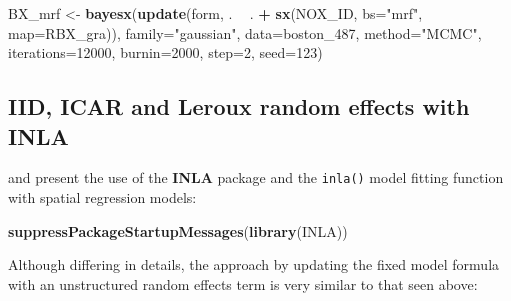 \documentclass[]{book}
\newenvironment{Shaded}{\begin{snugshade}}{\end{snugshade}}
\newcommand{\DataTypeTok}[1]{\textcolor[rgb]{0.13,0.29,0.53}{#1}}
\newcommand{\DecValTok}[1]{\textcolor[rgb]{0.00,0.00,0.81}{#1}}
\newcommand{\KeywordTok}[1]{\textcolor[rgb]{0.13,0.29,0.53}{\textbf{#1}}}
\newcommand{\NormalTok}[1]{#1}
\newcommand{\OperatorTok}[1]{\textcolor[rgb]{0.81,0.36,0.00}{\textbf{#1}}}
\newcommand{\StringTok}[1]{\textcolor[rgb]{0.31,0.60,0.02}{#1}}
\begin{document}
\begin{Shaded}
\begin{Highlighting}[]
\NormalTok{BX_mrf <-}\StringTok{ }\KeywordTok{bayesx}\NormalTok{(}\KeywordTok{update}\NormalTok{(form, . }\OperatorTok{~}\StringTok{ }\NormalTok{. }\OperatorTok{+}\StringTok{ }\KeywordTok{sx}\NormalTok{(NOX_ID, }\DataTypeTok{bs=}\StringTok{"mrf"}\NormalTok{, }\DataTypeTok{map=}\NormalTok{RBX_gra)), }
                 \DataTypeTok{family=}\StringTok{"gaussian"}\NormalTok{, }\DataTypeTok{data=}\NormalTok{boston_}\DecValTok{487}\NormalTok{, }\DataTypeTok{method=}\StringTok{"MCMC"}\NormalTok{, }
                 \DataTypeTok{iterations=}\DecValTok{12000}\NormalTok{, }\DataTypeTok{burnin=}\DecValTok{2000}\NormalTok{, }\DataTypeTok{step=}\DecValTok{2}\NormalTok{, }\DataTypeTok{seed=}\DecValTok{123}\NormalTok{)}
\end{Highlighting}
\end{Shaded}

\begin{Shaded}
\end{Shaded}

\hypertarget{iid-icar-and-leroux-random-effects-with-inla}{%
\subsection{IID, ICAR and Leroux random effects with INLA}\label{iid-icar-and-leroux-random-effects-with-inla}}

\citet{JSSv063i20} and \citet{gómez2020bayesian} present the use of the \textbf{INLA} package \citep{R-INLA} and the \texttt{inla()} model fitting function with spatial regression models:

\begin{Shaded}
\begin{Highlighting}[]
\KeywordTok{suppressPackageStartupMessages}\NormalTok{(}\KeywordTok{library}\NormalTok{(INLA))}
\end{Highlighting}
\end{Shaded}

Although differing in details, the approach by updating the fixed model formula with an unstructured random effects term is very similar to that seen above:
\end{document}
